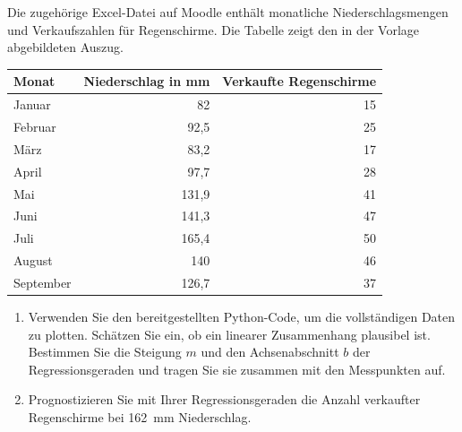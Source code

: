 \begin{ExerciseBlock}
Die zugehörige Excel-Datei auf Moodle enthält monatliche Niederschlagsmengen und Verkaufszahlen für Regenschirme. Die Tabelle zeigt den in der Vorlage abgebildeten Auszug.
\begin{center}
\begin{tabular}{lrr}
\toprule
Monat & Niederschlag in \unit{\milli\metre} & Verkaufte Regenschirme\\
\midrule
Januar & 82 & 15\\
Februar & 92,5 & 25\\
März & 83,2 & 17\\
April & 97,7 & 28\\
Mai & 131,9 & 41\\
Juni & 141,3 & 47\\
Juli & 165,4 & 50\\
August & 140 & 46\\
September & 126,7 & 37\\
\bottomrule
\end{tabular}
\end{center}
\begin{enumerate}
\item Verwenden Sie den bereitgestellten Python-Code, um die vollständigen Daten zu plotten. Schätzen Sie ein, ob ein linearer Zusammenhang plausibel ist. Bestimmen Sie die Steigung $m$ und den Achsenabschnitt $b$ der Regressionsgeraden und tragen Sie sie zusammen mit den Messpunkten auf.
\item Prognostizieren Sie mit Ihrer Regressionsgeraden die Anzahl verkaufter Regenschirme bei \qty{162}{\milli\metre} Niederschlag.
\end{enumerate}
\end{ExerciseBlock}
